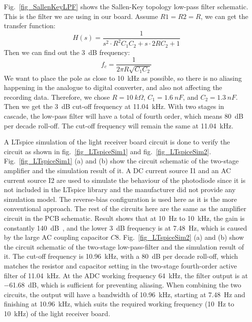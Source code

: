 Fig.~\ref{fig_SallenKeyLPF} shows the Sallen-Key topology low-pass filter schematic.  This is the filter we are using in our board.  Assume $R1=R2=R$, we can get the transfer function:
$$H(s) = \frac{1}{s^2 \cdot R^2 C_1 C_2 + s \cdot 2R C_2 + 1}$$
Then we can find out the \qty{3}{dB} frequency:
$$f_c = \frac{1}{2\pi R \sqrt{C_1 C_2}}$$
We want to place the pole as close to \qty{10}{kHz} as possible, so there is no aliasing happening in the analogue to digital converter, and also not affecting the recording data.  Therefore, we chose $R=\qty{10}{k\Omega}$, $C_1=\qty{1.6}{nF}$, and $C_2=\qty{1.3}{nF}$.  Then we get the \qty{3}{dB} cut-off frequency at \qty{11.04}{kHz}.  With two stages in cascade, the low-pass filter will have a total of fourth order, which means \qty{80}{dB} per decade roll-off.  The cut-off frequency will remain the same at \qty{11.04}{kHz}.

A LTspice simulation of the light receiver board circuit is done to verify the circuit as shown in fig.~\ref{fig_LTspiceSim1} and fig.~\ref{fig_LTspiceSim2}.  Fig.~\ref{fig_LTspiceSim1} (a) and (b) show the circuit schematic of the two-stage amplifier and the simulation result of it.  A DC current source I1 and an AC current source I2 are used to simulate the behaviour of the photodiode since it is not included in the LTspice library and the manufacturer did not provide any simulation model.  The reverse-bias configuration is used here as it is the more conventional approach.  The rest of the circuits here are the same as the amplifier circuit in the PCB schematic.  Result shows that at \qty{10}{Hz} to \qty{10}{kHz}, the gain is constantly \qty{140}{dB\Omega}, and the lower \qty{3}{dB} frequency is at \qty{7.48}{Hz}, which is caused by the large AC coupling capacitor $C8$.  Fig.~\ref{fig_LTspiceSim2} (a) and (b) show the circuit schematic of the two-stage low-pass-filter and the simulation result of it.  The cut-off frequency is \qty{10.96}{kHz}, with a \qty{80}{dB} per decade roll-off, which matches the resistor and capacitor setting in the two-stage fourth-order active filter of \qty{11.04}{kHz}.  At the ADC working frequency \qty{64}{kHz}, the filter output is at \qty{-61.68}{dB}, which is sufficient for preventing aliasing.  When combining the two circuits, the output will have a bandwidth of \qty{10.96}{kHz}, starting at \qty{7.48}{Hz} and finishing at \qty{10.96}{kHz}, which suits the required working frequency (\qty{10}{Hz} to \qty{10}{kHz}) of the light receiver board.

